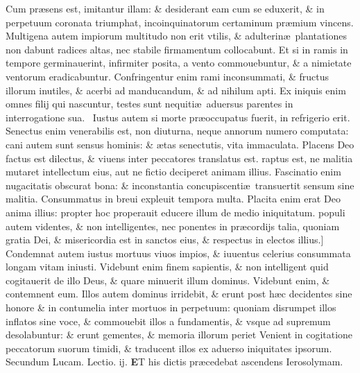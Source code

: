 \documentclass[a5paper,10pt]{book}
\def\leftmarginnote{%
	\lrmarginnote{\hskip -\marginparsep \hskip -6.5em}}
\def\rightmarginnote{%
	\lrmarginnote{\hskip\columnwidth \hskip -1em}}
\def\ae{æ}
\begin{document}
\begin{multicols*}{2}
Cum pr\ae sens est, imitantur illam: \& desiderant eam cum se eduxerit, \& in perpetuum coronata triumphat, incoinquinatorum certaminum pr\ae mium vincens.
Multigena autem impiorum multitudo non erit vtilis, \& adulterin\ae \ plantationes non dabunt radices altas, nec stabile firmamentum collocabunt.
Et si in ramis in tempore
germinauerint, infirmiter posita, a vento commouebuntur, \& a nimietate ventorum eradicabuntur.
Confringentur enim rami inconsummati, \& fructus illorum inutiles, \& acerbi ad manducandum, \& ad nihilum apti.
Ex iniquis enim omnes filij qui nascuntur, testes sunt nequiti\ae \ aduersus parentes in interrogatione sua. \textdagger \ 
Iustus\leftmarginnote{\begin{flushright}C\end{flushright}} autem si morte pr\ae occupatus fuerit, in refrigerio erit.
Senectus enim venerabilis est, non diuturna, neque annorum numero computata: cani autem sunt sensus hominis: \& \ae tas senectutis, vita immaculata.
Placens Deo factus est dilectus, \& viuens inter peccatores translatus est.
raptus est, ne malitia mutaret intellectum eius, aut ne fictio deciperet animam illius. Fascinatio enim nugacitatis obscurat bona: \& inconstantia concupiscenti\ae \ transuertit sensum sine malitia.
Consummatus in breui expleuit tempora multa. Placita enim erat Deo anima illius: propter hoc properauit educere illum de medio iniquitatum.
populi autem videntes, \& non intelligentes, nec ponentes in pr\ae cordijs talia, quoniam gratia Dei, \& misericordia est in sanctos eius, \& respectus in electos illius.]
Condemnat\rightmarginnote{D} autem iustus mortuus viuos impios, \& iuuentus celerius consummata longam vitam iniusti.
Videbunt enim finem sapientis, \& non intelligent quid cogitauerit de illo Deus, \& quare minuerit illum dominus.
Videbunt enim, \& contemnent eum. Illos autem dominus irridebit, \& erunt post h\ae c decidentes sine honore \& in contumelia inter mortuos in perpetuum: quoniam disrumpet illos inflatos sine voce, \& commouebit illos a fundamentis, \& vsque ad supremum desolabuntur: \& erunt gementes, \& memoria illorum periet
Venient in cogitatione peccatorum suorum timidi, \& traducent illos ex aduerso iniquitates ipsorum.
\fancyhead[C]{\color{red} Feria. iij. Dominic\ae . iij. post aduentum}
\newline \color{red} Secundum Lucam. \hfill Lectio. ij. \color{black}
\vspace{-.25em}
\lettrine[lines=2]{\bfseries \color{red} E}{}T\rightmarginnote{c. 19.} his dictis pr\ae cedebat ascendens Ierosolymam.

\end{multicols*}
\end{document}
